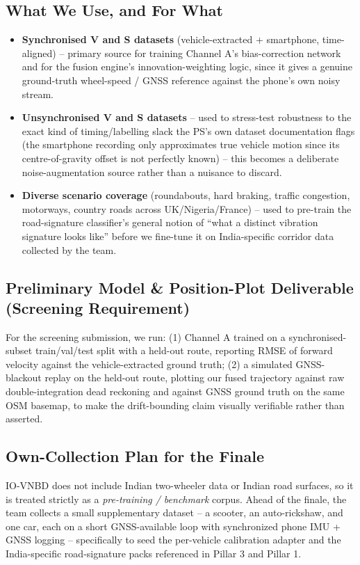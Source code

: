 \documentclass[10.5pt]{article}
\begin{document}
\subsection{What We Use, and For What}
\begin{itemize}
\item \textbf{Synchronised V and S datasets} (vehicle-extracted + smartphone, time-aligned) -- primary source for training Channel A's bias-correction network and for the fusion engine's innovation-weighting logic, since it gives a genuine ground-truth wheel-speed / GNSS reference against the phone's own noisy stream.
\item \textbf{Unsynchronised V and S datasets} -- used to stress-test robustness to the exact kind of timing/labelling slack the PS's own dataset documentation flags (the smartphone recording only approximates true vehicle motion since its centre-of-gravity offset is not perfectly known) -- this becomes a deliberate noise-augmentation source rather than a nuisance to discard.
\item \textbf{Diverse scenario coverage} (roundabouts, hard braking, traffic congestion, motorways, country roads across UK/Nigeria/France) -- used to pre-train the road-signature classifier's general notion of ``what a distinct vibration signature looks like'' before we fine-tune it on India-specific corridor data collected by the team.
\end{itemize}

\subsection{Preliminary Model \& Position-Plot Deliverable (Screening Requirement)}
For the screening submission, we run: (1) Channel A trained on a synchronised-subset train/val/test split with a held-out route, reporting RMSE of forward velocity against the vehicle-extracted ground truth; (2) a simulated GNSS-blackout replay on the held-out route, plotting our fused trajectory against raw double-integration dead reckoning and against GNSS ground truth on the same OSM basemap, to make the drift-bounding claim visually verifiable rather than asserted.

\subsection{Own-Collection Plan for the Finale}
IO-VNBD does not include Indian two-wheeler data or Indian road surfaces, so it is treated strictly as a \emph{pre-training / benchmark} corpus. Ahead of the finale, the team collects a small supplementary dataset -- a scooter, an auto-rickshaw, and one car, each on a short GNSS-available loop with synchronized phone IMU + GNSS logging -- specifically to seed the per-vehicle calibration adapter and the India-specific road-signature packs referenced in Pillar 3 and Pillar 1.
\end{document}
